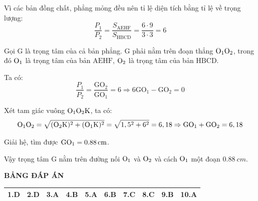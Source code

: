 \begin{enumerate}[label=\bfseries Câu \arabic*:]
{	Vì các bản đồng chất, phẳng mỏng đều nên tỉ lệ diện tích bằng tỉ lệ về trọng lượng:
	$$\dfrac{P_1}{P_2} = \dfrac{S_\text{AEHF}}{S_\text{HBCD}} = \dfrac{6 \cdot 9}{3 \cdot 3} = 6$$
	
	Gọi G là trọng tâm của cả bản phẳng. G phải nằm trên đoạn thẳng $\text O_1 \text O_2$, trong đó $\text O_1$ là trọng tâm của bản $\text{AEHF}$, $\text O_2$ là trọng tâm của bản $\text{HBCD}$.
	
	Ta có:
	$$\dfrac{P_1}{P_2} = \dfrac{\text{GO}_2}{\text{GO}_1} = 6 \Rightarrow 6 \text{GO}_1 - \text{GO}_2 = 0$$
	
	Xét tam giác vuông $\text O_1 \text O_2 \text K$, ta có:
	$$\text O_1 \text O_2 = \sqrt{(\text O_2 \text K)^2 + (\text O_1 \text K)^2} = \sqrt{1,5^2 + 6^2} = 6,18 \Rightarrow \text G \text O_1 + \text G \text O_2 =6,18$$
	
	Giải hệ, tìm được $\text G \text O_1 = \SI{0.88}{cm}$.
	
	Vậy trọng tâm G nằm trên đường nối $\text O_1$ và $\text O_2$ và cách $\text O_1$ một đoạn $\SI{0.88}{cm}$.
}	
\end{enumerate}

\whiteBGstarEnd

\loigiai
{
	\begin{center}
		\textbf{BẢNG ĐÁP ÁN}
	\end{center}
	\begin{center}
		\begin{tabular}{|m{2.8em}|m{2.8em}|m{2.8em}|m{2.8em}|m{2.8em}|m{2.8em}|m{2.8em}|m{2.8em}|m{2.8em}|m{2.8em}|}
			\hline
			1.D  & 2.D  & 3.A  & 4.B  & 5.A  & 6.B & 7.C & 8.C & 9.B & 10.A  \\
			\hline
			
		\end{tabular}
	\end{center}
}
